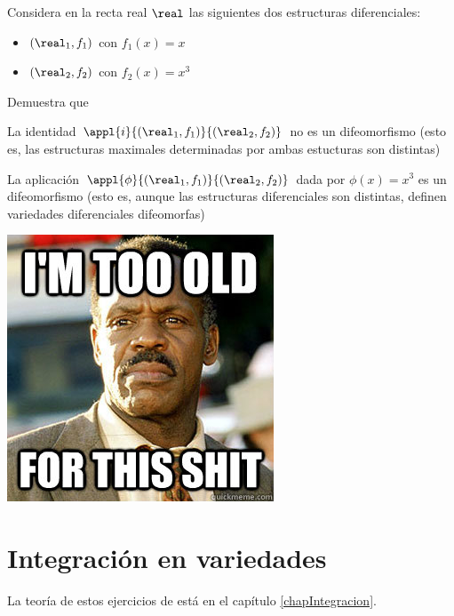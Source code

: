 \begin{problem}[15]
Considera en la recta real $\real$ las siguientes dos estructuras diferenciales:
\begin{itemize}
\item $(\real_1, f_1)$ con $f_1(x)=x$
\item $(\real_2, f_2)$ con $f_2(x)=x^3$
\end{itemize}
Demuestra que

\ppart
La identidad $\appl{i}{(\real_1, f_1)}{(\real_2, f_2)}$ no es un difeomorfismo (esto es, las estructuras maximales determinadas por ambas estucturas son distintas)

\spart

La aplicación $\appl{\phi}{(\real_1, f_1)}{(\real_2, f_2)}$ dada por $\phi(x)=x^3$ es un difeomorfismo (esto es, aunque las estructuras diferenciales son distintas, definen variedades diferenciales difeomorfas)

\solution

\begin{center}
\includegraphics[keepaspectratio=true,width=0.6\linewidth]{img/too_old.jpg}
\end{center}


\end{problem}

\section{Integración en variedades}

La teoría de estos ejercicios de \cite[Capítulo 4]{doCarmo94} está en el capítulo \ref{chapIntegracion}.

